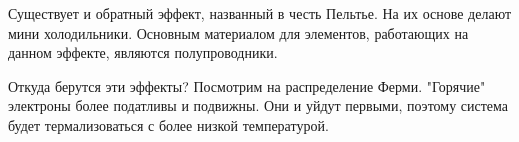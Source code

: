 \documentclass[a4paper, 12pt]{article}
\begin{document}
	Существует и обратный эффект, названный в честь Пельтье. На их основе делают мини холодильники. Основным материалом для элементов, работающих на данном эффекте, являются полупроводники.
	
	Откуда берутся эти эффекты? Посмотрим на распределение Ферми. "Горячие" электроны более податливы и подвижны. Они и уйдут первыми, поэтому система будет термализоваться с более низкой температурой.
\end{document}
